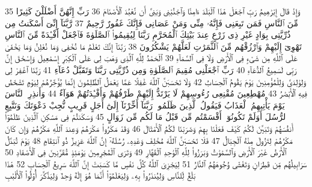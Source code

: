 {\tiny\colorbox{cl_aya}{35}} وَإِذْ قَالَ إِبْرَٰهِيمُ رَبِّ ٱجْعَلْ هَٰذَا ٱلْبَلَدَ ءَامِنًا وَٱجْنُبْنِى وَبَنِىَّ أَن نَّعْبُدَ ٱلْأَصْنَامَ
{\tiny\colorbox{cl_aya}{36}} رَبِّ إِنَّهُنَّ أَضْلَلْنَ كَثِيرًا مِّنَ ٱلنَّاسِ فَمَن تَبِعَنِى فَإِنَّهُۥ مِنِّى وَمَنْ عَصَانِى فَإِنَّكَ غَفُورٌ رَّحِيمٌ
{\tiny\colorbox{cl_aya}{37}} رَّبَّنَآ إِنِّىٓ أَسْكَنتُ مِن ذُرِّيَّتِى بِوَادٍ غَيْرِ ذِى زَرْعٍ عِندَ بَيْتِكَ ٱلْمُحَرَّمِ رَبَّنَا لِيُقِيمُوا۟ ٱلصَّلَوٰةَ فَٱجْعَلْ أَفْـِٔدَةً مِّنَ ٱلنَّاسِ تَهْوِىٓ إِلَيْهِمْ وَٱرْزُقْهُم مِّنَ ٱلثَّمَرَٰتِ لَعَلَّهُمْ يَشْكُرُونَ
{\tiny\colorbox{cl_aya}{38}} رَبَّنَآ إِنَّكَ تَعْلَمُ مَا نُخْفِى وَمَا نُعْلِنُ وَمَا يَخْفَىٰ عَلَى ٱللَّهِ مِن شَىْءٍ فِى ٱلْأَرْضِ وَلَا فِى ٱلسَّمَآءِ
{\tiny\colorbox{cl_aya}{39}} ٱلْحَمْدُ لِلَّهِ ٱلَّذِى وَهَبَ لِى عَلَى ٱلْكِبَرِ إِسْمَٰعِيلَ وَإِسْحَٰقَ إِنَّ رَبِّى لَسَمِيعُ ٱلدُّعَآءِ
{\tiny\colorbox{cl_aya}{40}} رَبِّ ٱجْعَلْنِى مُقِيمَ ٱلصَّلَوٰةِ وَمِن ذُرِّيَّتِى رَبَّنَا وَتَقَبَّلْ دُعَآءِ
{\tiny\colorbox{cl_aya}{41}} رَبَّنَا ٱغْفِرْ لِى وَلِوَٰلِدَىَّ وَلِلْمُؤْمِنِينَ يَوْمَ يَقُومُ ٱلْحِسَابُ
{\tiny\colorbox{cl_aya}{42}} وَلَا تَحْسَبَنَّ ٱللَّهَ غَٰفِلًا عَمَّا يَعْمَلُ ٱلظَّٰلِمُونَ إِنَّمَا يُؤَخِّرُهُمْ لِيَوْمٍ تَشْخَصُ فِيهِ ٱلْأَبْصَٰرُ
{\tiny\colorbox{cl_aya}{43}} مُهْطِعِينَ مُقْنِعِى رُءُوسِهِمْ لَا يَرْتَدُّ إِلَيْهِمْ طَرْفُهُمْ وَأَفْـِٔدَتُهُمْ هَوَآءٌ
{\tiny\colorbox{cl_aya}{44}} وَأَنذِرِ ٱلنَّاسَ يَوْمَ يَأْتِيهِمُ ٱلْعَذَابُ فَيَقُولُ ٱلَّذِينَ ظَلَمُوا۟ رَبَّنَآ أَخِّرْنَآ إِلَىٰٓ أَجَلٍ قَرِيبٍ نُّجِبْ دَعْوَتَكَ وَنَتَّبِعِ ٱلرُّسُلَ أَوَلَمْ تَكُونُوٓا۟ أَقْسَمْتُم مِّن قَبْلُ مَا لَكُم مِّن زَوَالٍ
{\tiny\colorbox{cl_aya}{45}} وَسَكَنتُمْ فِى مَسَٰكِنِ ٱلَّذِينَ ظَلَمُوٓا۟ أَنفُسَهُمْ وَتَبَيَّنَ لَكُمْ كَيْفَ فَعَلْنَا بِهِمْ وَضَرَبْنَا لَكُمُ ٱلْأَمْثَالَ
{\tiny\colorbox{cl_aya}{46}} وَقَدْ مَكَرُوا۟ مَكْرَهُمْ وَعِندَ ٱللَّهِ مَكْرُهُمْ وَإِن كَانَ مَكْرُهُمْ لِتَزُولَ مِنْهُ ٱلْجِبَالُ
{\tiny\colorbox{cl_aya}{47}} فَلَا تَحْسَبَنَّ ٱللَّهَ مُخْلِفَ وَعْدِهِۦ رُسُلَهُۥٓ إِنَّ ٱللَّهَ عَزِيزٌ ذُو ٱنتِقَامٍ
{\tiny\colorbox{cl_aya}{48}} يَوْمَ تُبَدَّلُ ٱلْأَرْضُ غَيْرَ ٱلْأَرْضِ وَٱلسَّمَٰوَٰتُ وَبَرَزُوا۟ لِلَّهِ ٱلْوَٰحِدِ ٱلْقَهَّارِ
{\tiny\colorbox{cl_aya}{49}} وَتَرَى ٱلْمُجْرِمِينَ يَوْمَئِذٍ مُّقَرَّنِينَ فِى ٱلْأَصْفَادِ
{\tiny\colorbox{cl_aya}{50}} سَرَابِيلُهُم مِّن قَطِرَانٍ وَتَغْشَىٰ وُجُوهَهُمُ ٱلنَّارُ
{\tiny\colorbox{cl_aya}{51}} لِيَجْزِىَ ٱللَّهُ كُلَّ نَفْسٍ مَّا كَسَبَتْ إِنَّ ٱللَّهَ سَرِيعُ ٱلْحِسَابِ
{\tiny\colorbox{cl_aya}{52}} هَٰذَا بَلَٰغٌ لِّلنَّاسِ وَلِيُنذَرُوا۟ بِهِۦ وَلِيَعْلَمُوٓا۟ أَنَّمَا هُوَ إِلَٰهٌ وَٰحِدٌ وَلِيَذَّكَّرَ أُو۟لُوا۟ ٱلْأَلْبَٰبِ
